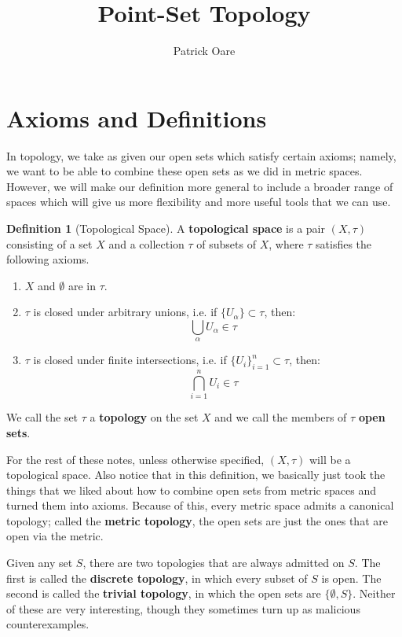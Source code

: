 \documentclass[11pt, oneside]{amsart}   	%
\title{Point-Set Topology}
\author{Patrick Oare}
\date{}							%
\theoremstyle{definition}
\newtheorem{definition}{Definition}[section]
\begin{document}
\maketitle

\section{Axioms and Definitions}

	In topology, we take as given our open sets which satisfy certain axioms; namely, we want to be able to combine these open sets as we did in metric 
	spaces. However, we will make our definition more general to include a broader range of spaces which will give us more flexibility and more useful 
	tools that we can use.
	
	\begin{definition}[Topological Space] A \textbf{topological space} is a pair $(X, \tau)$ consisting of a set $X$ and a collection $\tau$ of subsets of $X$, where 
	$\tau$ satisfies the following axioms.
		\begin{enumerate}
			\item $X$ and $\emptyset$ are in $\tau$.
			\item $\tau$ is closed under arbitrary unions, i.e. if $\{U_\alpha\}\subset\tau$, then:
			$$
				\bigcup_\alpha U_\alpha\in\tau
			$$
			\item $\tau$ is closed under finite intersections, i.e. if $\{U_i\}_{i = 1}^n\subset\tau$, then:
			$$
				\bigcap_{i = 1}^n U_i\in\tau
			$$
		\end{enumerate}
	We call the set $\tau$ a \textbf{topology} on the set $X$ and we call the members of $\tau$ \textbf{open sets}. 
	\end{definition}
	
	For the rest of these notes, unless otherwise specified, $(X, \tau)$ will be a topological space. Also notice that in this definition, we basically just took the 
	things that we liked about how to combine open sets from metric spaces and turned them into axioms. Because of this, every metric space admits a 
	canonical topology; called the \textbf{metric topology}, the open sets are just the ones that are open via the metric. 
	
	Given any set $S$, there are two topologies that are always admitted on $S$. The first is called the \textbf{discrete topology}, in which every subset of $S$ 
	is open. The second is called the \textbf{trivial topology}, in which the open sets are $\{\emptyset, S\}$. Neither of these are very interesting, though they 
	sometimes turn up as malicious counterexamples.
	
\end{document}
